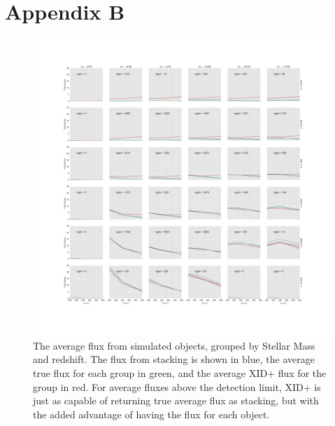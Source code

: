 \documentclass[useAMS,usenatbib]{mnras}
\begin{document}
\section*{Appendix B}\label{stacking_app}
\clearpage
\begin{figure}
\onecolumn
\includegraphics[width=18cm]{Stacking.pdf}
\caption{The average flux from simulated objects, grouped by Stellar Mass and redshift. The flux from stacking is shown in blue, the average true flux for each group in green, and the average \textsc{XID+} flux for the group in red. For average fluxes above the detection limit, \textsc{XID+} is just as capable of returning true average flux as stacking, but with the added advantage of having the flux for each object.}\label{fig:stack}
\end{figure}


%
%
%
%
%
%
\end{document}
